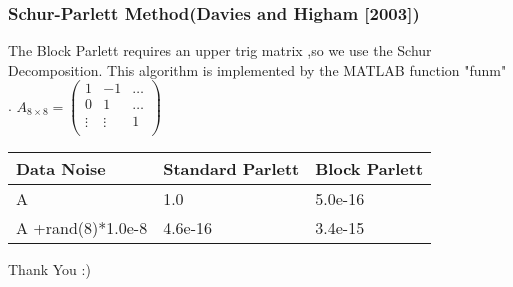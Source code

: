 \begin{frame}
\frametitle{Schur-Parlett Method\newline (Davies and Higham [2003])}
The Block Parlett requires an upper trig matrix ,so we use the Schur Decomposition.
\newline
This algorithm is implemented by the MATLAB function "funm" .
\newline
$
A_{8 \times 8} = \begin{pmatrix}
    1 &-1 & \dots \\
    0 & 1 & \dots \\
    \vdots & \vdots & 1\\
\end{pmatrix}
$ \;

    \begin{table}[]
        \begin{tabular}{lll}
            Data Noise        & Standard Parlett             & Block Parlett \\ \hline
            A                 & \multicolumn{1}{|l}{1.0}     & 5.0e-16       \\
            A +rand(8)*1.0e-8 & \multicolumn{1}{|l}{4.6e-16} & 3.4e-15      
        \end{tabular}
    \end{table}

Thank You :)
\end{frame}